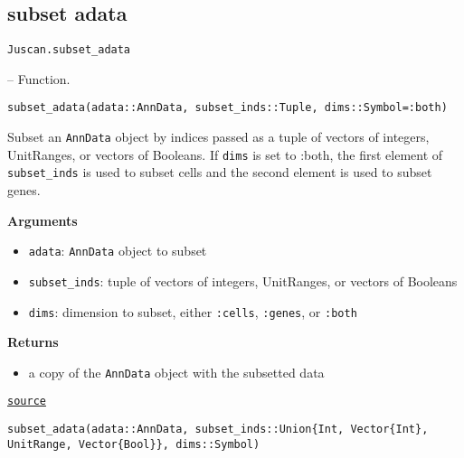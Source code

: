 \documentclass[oneside]{memoir}
\begin{document}
\subsection{subset adata}



\label{17184326838247328209}{}

\hypertarget{11445546764670757650}{\texttt{Juscan.subset\_adata}}  -- {Function.}

\begin{adjustwidth}{2em}{0pt}


\begin{verbatim}
subset_adata(adata::AnnData, subset_inds::Tuple, dims::Symbol=:both)
\end{verbatim}

Subset an \texttt{AnnData} object by indices passed as a tuple of vectors of integers, UnitRanges, or vectors of Booleans. If \texttt{dims} is set to :both, the first element of \texttt{subset\_inds} is used to subset cells and the second element is used to subset genes.

\textbf{Arguments}

\begin{itemize}
\item \texttt{adata}: \texttt{AnnData} object to subset


\item \texttt{subset\_inds}: tuple of vectors of integers, UnitRanges, or vectors of Booleans


\item \texttt{dims}: dimension to subset, either \texttt{:cells}, \texttt{:genes}, or \texttt{:both}

\end{itemize}
\textbf{Returns}

\begin{itemize}
\item a copy of the \texttt{AnnData} object with the subsetted data

\end{itemize}


\href{https://github.com/zehua0417/Juscan.jl/blob/393ad1b827b678ea98a738f92af658ee9ed9a403/src/anndata.jl#L195-L208}{\texttt{source}}



\begin{verbatim}
subset_adata(adata::AnnData, subset_inds::Union{Int, Vector{Int}, UnitRange, Vector{Bool}}, dims::Symbol)
\end{verbatim}


\end{adjustwidth}
\end{document}
